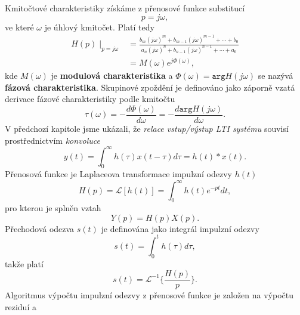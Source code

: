 {      Kmitočtové charakteristiky získáme z přenosové funkce substitucí
      \begin{equation}\label{SAS:eq_p_jomega}
          p = j\omega,
      \end{equation}
      ve které $\omega$ je úhlový kmitočet. Platí tedy
      \begin{align}
          H(p)\mid_{p = j\omega} 
            &=\frac{b_m(j\omega)^m+b_{m-1}(j\omega)^{m-1}                     
             +\cdots+b_0}{a_n(j\omega)^n+b_{n-1}(j\omega)^{n-1}+\cdots+a_0}      \nonumber \\
            &=M(\omega)e^{j\Phi(\omega)},                                        \label{tky:eq003}
      \end{align}
      kde $M(\omega)$ je \textbf{modulová charakteristika} a $\Phi(\omega)=\texttt{arg}H(j\omega)$ 
      se nazývá \textbf{fázová charakteristika}. Skupinové zpoždění je definováno jako záporně vzatá
      derivace fázové charakteristiky podle kmitočtu
      \begin{equation}\label{SAS:eq_skupinove_zpozdeni}
          \tau(\omega)=-\frac{d\Phi(\omega)}{d\omega}= - \frac{d \texttt{arg} H(j\omega)}{d\omega}.
      \end{equation}
      V předchozí kapitole jsme ukázali, že \emph{relace vstup/výstup LTI systému} souvisí
      pro\-střed\-nic\-tvím \emph{konvoluce}
      \begin{equation}\label{SAS:eq_popis_konvoluce}
          y(t)=\int_0^\infty h(\tau)x(t-\tau)d\tau = h(t)*x(t).
      \end{equation}
      Přenosová funkce je Laplaceova transformace impulzní odezvy $h(t)$
      \begin{equation}\label{SAS:eq_ht_Lap_trans_imp}
          H(p)=\mathcal{L}[h(t)]=\int_0^\infty h(t)e^{-pt}dt,
      \end{equation}
      pro kterou je splněn vztah
      \begin{equation}\label{SAS:eq_Yp}
          Y(p)=H(p)X(p).
      \end{equation}
      Přechodová odezva $s(t)$ je definována jako integrál impulzní odezvy
      \begin{equation}\label{SAS:eq_Prechod_odezva}
          s(t)=\int_0^th(\tau)d\tau,
      \end{equation}
      takže platí
      \begin{equation}\label{SAS:eq_st}
          s(t)=\mathcal{L}^{-1}\{\frac{H(p)}{p}\}.
      \end{equation}
      Algoritmus výpočtu impulzní odezvy z přenosové funkce je založen na výpočtu  reziduí a 
}

